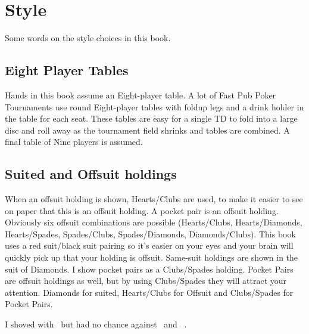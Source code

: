 \chapter{Style}


Some words on the style choices in this book.

\section*{Eight Player Tables}

Hands in this book assume an Eight-player table. A lot of Fast Pub
Poker Tournaments use round Eight-player tables with foldup legs and a
drink holder in the table for each seat. These tables are easy for a
single TD to fold into a large disc and roll away as the tournament
field shrinks and tables are combined. A final table of Nine players
is assumed.

\section*{Suited and Offsuit holdings}

When an offsuit holding is shown, Hearts/Clubs are used, to make
it easier to see on paper that this is an offsuit holding. A pocket
pair is an offsuit holding. Obviously six offsuit combinations are
possible (Hearts/Clubs, Hearts/Diamonds, Hearts/Spades, Spades/Clubs,
Spades/Diamonds, Diamonds/Clubs). This book uses a red suit/black suit
pairing so it's easier on your eyes and your brain will quickly pick
up that your holding is offsuit. Same-suit holdings are shown in the
suit of Diamonds. I show pocket pairs as a Clubs/Spades
holding. Pocket Pairs are offsuit holdings as well, but by using
Clubs/Spades they will attract your attention. Diamonds for suited,
Hearts/Clubs for Offsuit and Clubs/Spades for Pocket Pairs.

I shoved with \Ah\tenc\ but had no chance against \Ad\Kd\ and \Jc\Js\ .



